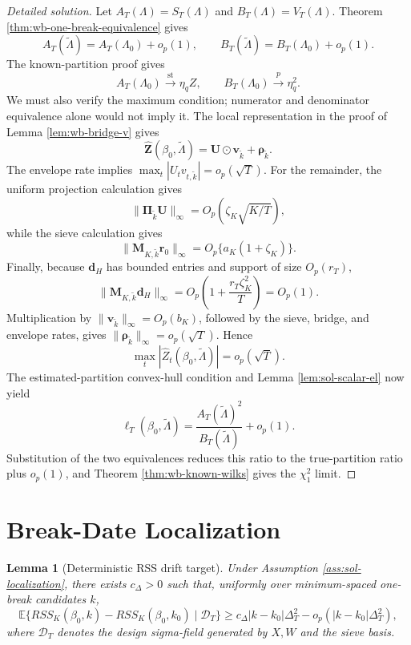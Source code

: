 \documentclass[12pt]{article}
\numberwithin{equation}{section}
\newtheorem{lemma}{Lemma}
\theoremstyle{definition}
\newcommand{\E}{\mathbb E}
\begin{document}
\begin{proof}[Detailed solution]
Let \(A_T(\Lambda)=S_T(\Lambda)\) and \(B_T(\Lambda)=V_T(\Lambda)\).
Theorem \ref{thm:wb-one-break-equivalence} gives
\[
    A_T(\widetilde\Lambda)=A_T(\Lambda_0)+o_p(1),
    \qquad
    B_T(\widetilde\Lambda)=B_T(\Lambda_0)+o_p(1).
\]
The known-partition proof gives
\[
    A_T(\Lambda_0)\xrightarrow{\mathrm{st}}\eta_qZ,
    \qquad
    B_T(\Lambda_0)\xrightarrow{p}\eta_q^2.
\]
We must also verify the maximum condition; numerator and denominator
 equivalence alone would not imply it.  The local representation in the proof
of Lemma \ref{lem:wb-bridge-v} gives
\[
    \widehat{\bm Z}(\beta_0,\widetilde\Lambda)
    =\bm U\odot\bm v_{\widetilde k}+\bm\rho_{\widetilde k}.
\]
The envelope rate implies
\(\max_t|U_tv_{t,\widetilde k}|=o_p(\sqrt T)\).  For the remainder, the
uniform projection calculation gives
\[
    \|\bm\Pi_{\widetilde k}\bm U\|_\infty
    =O_p\left(\zeta_K\sqrt{K/T}\right),
\]
while the sieve calculation gives
\[
    \|\bm M_{K,\widetilde k}\bm r_0\|_\infty
    =O_p\{a_K(1+\zeta_K)\}.
\]
Finally, because \(\bm d_H\) has bounded entries and support of size
\(O_p(r_T)\),
\[
    \|\bm M_{K,\widetilde k}\bm d_H\|_\infty
    =O_p\left(1+\frac{r_T\zeta_K^2}{T}\right)=O_p(1).
\]
Multiplication by \(\|\bm v_{\widetilde k}\|_\infty=O_p(b_K)\), followed by
the sieve, bridge, and envelope rates, gives
\(\|\bm\rho_{\widetilde k}\|_\infty=o_p(\sqrt T)\).  Hence
\[
    \max_t|\widehat Z_t(\beta_0,\widetilde\Lambda)|=o_p(\sqrt T).
\]
The estimated-partition convex-hull condition and Lemma
\ref{lem:sol-scalar-el} now yield
\[
    \ell_T(\beta_0,\widetilde\Lambda)
    =\frac{A_T(\widetilde\Lambda)^2}
           {B_T(\widetilde\Lambda)}+o_p(1).
\]
Substitution of the two equivalences reduces this ratio to the
true-partition ratio plus \(o_p(1)\), and Theorem
\ref{thm:wb-known-wilks} gives the \(\chi_1^2\) limit.
\end{proof}


\section{Break-Date Localization}
\label{sec:break-localization}

\begin{lemma}[Deterministic RSS drift target]
\label{lem:wb-rss-drift}
Under Assumption \ref{ass:sol-localization}, there exists
\(c_\Delta>0\) such that, uniformly over minimum-spaced one-break candidates
\(k\),
\[
    \E\{RSS_K(\beta_0,k)-RSS_K(\beta_0,k_0)\mid \mathcal D_T\}
    \geq
    c_\Delta |k-k_0|\Delta_T^2
    -
    o_p(|k-k_0|\Delta_T^2),
\]
where \(\mathcal D_T\) denotes the design sigma-field generated by \(X,W\) and the sieve basis.
\end{lemma}
\end{document}
